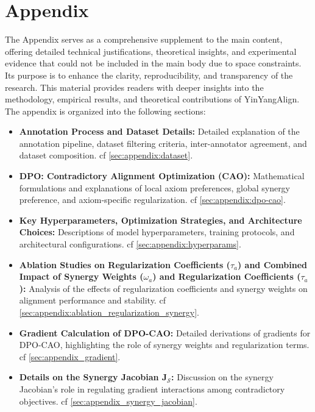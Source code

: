 

\appendix
\section{Appendix}
\label{sec:appendix}

The Appendix serves as a comprehensive supplement to the main content, offering detailed technical justifications, theoretical insights, and experimental evidence that could not be included in the main body due to space constraints. Its purpose is to enhance the clarity, reproducibility, and transparency of the research. This material provides readers with deeper insights into the methodology, empirical results, and theoretical contributions of YinYangAlign. The appendix is organized into the following sections:

\begin{itemize}
    \item \textbf{Annotation Process and Dataset Details:} 
    Detailed explanation of the annotation pipeline, dataset filtering criteria, inter-annotator agreement, and dataset composition. cf \cref{sec:appendix:dataset}.

    \item \textbf{DPO: Contradictory Alignment Optimization (CAO):} 
    Mathematical formulations and explanations of local axiom preferences, global synergy preference, and axiom-specific regularization. cf \cref{sec:appendix:dpo-cao}.

    \item \textbf{Key Hyperparameters, Optimization Strategies, and Architecture Choices:} 
    Descriptions of model hyperparameters, training protocols, and architectural configurations. cf \cref{sec:appendix:hyperparams}.

    \item \textbf{Ablation Studies on Regularization Coefficients (\( \tau_a \)) and Combined Impact of Synergy Weights (\( \omega_a \)) and Regularization Coefficients (\( \tau_a \)):} 
    Analysis of the effects of regularization coefficients and synergy weights on alignment performance and stability. cf \cref{sec:appendix:ablation_regularization_synergy}.

    \item \textbf{Gradient Calculation of DPO-CAO:} 
    Detailed derivations of gradients for DPO-CAO, highlighting the role of synergy weights and regularization terms. cf \cref{sec:appendix_gradient}.

    \item \textbf{Details on the Synergy Jacobian \(\mathbf{J}_{\mathcal{S}}\):} 
    Discussion on the synergy Jacobian's role in regulating gradient interactions among contradictory objectives. cf \cref{sec:appendix_synergy_jacobian}.


\end{itemize}
